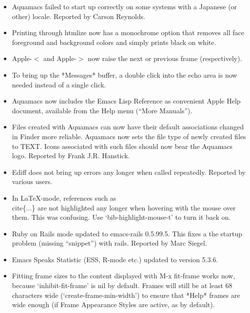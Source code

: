 \begin{itemize}

\item Aquamacs failed to start up correctly on some systems with a
  Japanese (or other) locale.
Reported by Carson Reynolds.

\item Printing through htmlize now has a monochrome option that
  removes all face foreground and background colors and simply prints
  black on white.

\item Apple-$<$ and Apple-$>$ now raise the next or previous frame (respectively).

\item To bring up the *Messages* buffer, a double click into the echo
  area is now needed instead of a single click.

\item Aquamacs now includes the Emacs Lisp Reference as convenient
  Apple Help document, available from the Help menu (``More Manuals'').

\item Files created with Aquamacs can now have their default associations changed in Finder more reliable. Aquamacs now sets the file type of newly created files to TEXT. Icons associated with such files should now bear the Aquamacs logo.
Reported by Frank J.R. Hanstick.

\item Ediff does not bring up errors any longer when called repeatedly.
Reported by various users.

\item In LaTeX-mode, references such as \\cite\{...\} are not
  highlighted any longer when hovering with the mouse over them. This
  was confusing. Use `bib-highlight-mouse-t' to turn it back on.

\item Ruby on Rails mode updated to emacs-rails 0.5.99.5. This  fixes
  a the startup problem (missing ``snippet'') with rails.
  Reported by Marc Siegel.

\item Emacs Speaks Statistic (ESS, R-mode etc.) updated to version 5.3.6.

\item Fitting frame sizes to the content displayed with M-x fit-frame
  works now, because `inhibit-fit-frame' is nil by default. Frames
  will still be at least 68 characters wide (`create-frame-min-width')
  to ensure that *Help* frames are wide enough (if Frame Appearance
  Styles are active, as by default).


\end{itemize}
